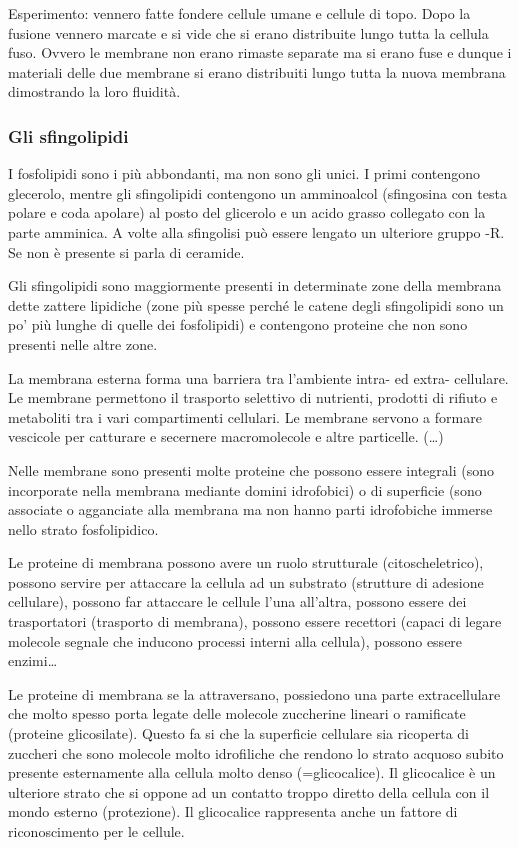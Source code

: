 \documentclass[]{article}
\begin{document}
Esperimento: vennero fatte fondere cellule umane e cellule di topo. Dopo
la fusione vennero marcate e si vide che si erano distribuite lungo
tutta la cellula fuso. Ovvero le membrane non erano rimaste separate ma
si erano fuse e dunque i materiali delle due membrane si erano
distribuiti lungo tutta la nuova membrana dimostrando la loro fluidità.

\subsubsection{Gli sfingolipidi}\label{gli-sfingolipidi}

I fosfolipidi sono i più abbondanti, ma non sono gli unici. I primi
contengono glecerolo, mentre gli sfingolipidi contengono un amminoalcol
(sfingosina con testa polare e coda apolare) al posto del glicerolo e un
acido grasso collegato con la parte amminica. A volte alla sfingolisi
può essere lengato un ulteriore gruppo -R. Se non è presente si parla di
ceramide.

Gli sfingolipidi sono maggiormente presenti in determinate zone della
membrana dette zattere lipidiche (zone più spesse perché le catene degli
sfingolipidi sono un po' più lunghe di quelle dei fosfolipidi) e
contengono proteine che non sono presenti nelle altre zone.

La membrana esterna forma una barriera tra l'ambiente intra- ed extra-
cellulare. Le membrane permettono il trasporto selettivo di nutrienti,
prodotti di rifiuto e metaboliti tra i vari compartimenti cellulari. Le
membrane servono a formare vescicole per catturare e secernere
macromolecole e altre particelle. (\ldots{})

Nelle membrane sono presenti molte proteine che possono essere integrali
(sono incorporate nella membrana mediante domini idrofobici) o di
superficie (sono associate o agganciate alla membrana ma non hanno parti
idrofobiche immerse nello strato fosfolipidico.

Le proteine di membrana possono avere un ruolo strutturale
(citoscheletrico), possono servire per attaccare la cellula ad un
substrato (strutture di adesione cellulare), possono far attaccare le
cellule l'una all'altra, possono essere dei trasportatori (trasporto di
membrana), possono essere recettori (capaci di legare molecole segnale
che inducono processi interni alla cellula), possono essere
enzimi\ldots{}

Le proteine di membrana se la attraversano, possiedono una parte
extracellulare che molto spesso porta legate delle molecole zuccherine
lineari o ramificate (proteine glicosilate). Questo fa si che la
superficie cellulare sia ricoperta di zuccheri che sono molecole molto
idrofiliche che rendono lo strato acquoso subito presente esternamente
alla cellula molto denso (=glicocalice). Il glicocalice è un ulteriore
strato che si oppone ad un contatto troppo diretto della cellula con il
mondo esterno (protezione). Il glicocalice rappresenta anche un fattore
di riconoscimento per le cellule.
\end{document}
